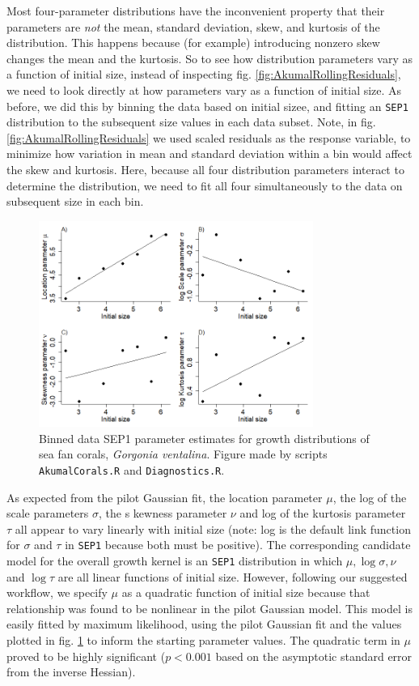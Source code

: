 \documentclass[11pt]{article}
\begin{document}
{Most four-parameter distributions have the inconvenient property that their parameters are \emph{not} the mean, standard deviation, skew,
and kurtosis of the distribution. This happens because (for example) introducing nonzero skew changes the mean and the kurtosis. 
So to see how distribution parameters vary as a function of initial size, instead of inspecting fig. \ref{fig:AkumalRollingResiduals}, we need
to look directly at how parameters vary as a function of initial size. As before, we did this by binning the data based on initial sizee, 
and fitting an \texttt{SEP1} distribution to the subsequent size values in each data subset. Note, 
in fig. \ref{fig:AkumalRollingResiduals} we used scaled residuals as the response variable, 
to minimize how variation in mean and standard deviation within a bin would affect the skew and kurtosis. 
Here, because all four distribution parameters interact to determine the distribution, we need to fit all 
four simultaneously to the data on subsequent size in each bin. 

\begin{figure}[tbp]
\centering
\includegraphics[width=0.8\textwidth]{figures/RollingSEP1parsCorals.png}
\caption{Binned data SEP1 parameter estimates for growth distributions of sea fan corals, \emph{Gorgonia ventalina}. 
Figure made by scripts \texttt{AkumalCorals.R} and \texttt{Diagnostics.R}.}
\label{fig:AkumalRollingSEP1pars}
\end{figure} 

As expected from the pilot Gaussian fit, the location parameter $\mu$, the log of the scale parameters $\sigma$, the s
kewness parameter $\nu$ and log of the kurtosis parameter $\tau$ all appear to vary linearly with initial size 
(note: log is the default link function for $\sigma$ and $\tau$ in \texttt{SEP1} because both must be positive).
The corresponding candidate model for the overall growth kernel is an \texttt{SEP1} distribution in 
which $\mu, \log \sigma, \nu$ and $\log \tau$ are all linear functions of initial size.
However, following our suggested workflow, we specify $\mu$ as a quadratic function of initial size because that relationship
was found to be nonlinear in the pilot Gaussian model. This model is easily fitted by maximum likelihood, 
using the pilot Gaussian fit and the values plotted in fig. \ref{fig:AkumalRollingSEP1pars} to 
inform the starting parameter values. The quadratic term in $\mu$ proved to be highly significant
($p<0.001$ based on the asymptotic standard error from the inverse Hessian). 

}
\end{document}
